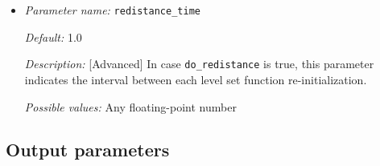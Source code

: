 \begin{itemize}
\item {\it Parameter name:} {\tt redistance\_time}
\label{parameters:redistance_time}


{\it Default:} 1.0

{\it Description:} [Advanced] In case {\tt do\_redistance} is true, this parameter indicates the interval between each level set function re-initialization.

{\it Possible values:} Any floating-point number

\end{itemize}


\subsection{Output parameters}
\label{parameters:output}

